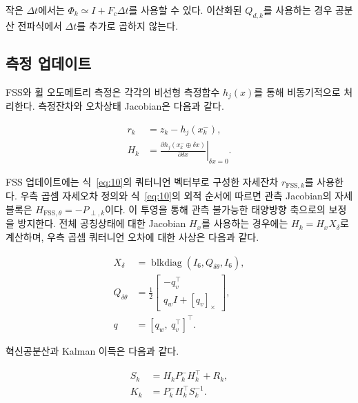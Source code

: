\documentclass[]{IAC_style}
\begin{document}
작은 $\Delta t$에서는 $\Phi_k \simeq I+F_c\Delta t$를 사용할 수 있다. 이산화된 $Q_{d,k}$를 사용하는 경우 공분산 전파식에서 $\Delta t$를 추가로 곱하지 않는다.

\subsection{측정 업데이트}

FSS와 휠 오도메트리 측정은 각각의 비선형 측정함수 $h_j(x)$를 통해 비동기적으로 처리한다. 측정잔차와 오차상태 Jacobian은 다음과 같다.

\begin{equation}
\tag{25}\label{eq:25}
\begin{aligned}r_k&=z_k-h_j(x_k^-),\\H_k&=\left.\frac{\partial h_j(x_k^-\oplus\delta x)}{\partial\delta x}\right|_{\delta x=0}.\end{aligned}
\end{equation}

FSS 업데이트에는 식~\eqref{eq:10}의 쿼터니언 벡터부로 구성한 자세잔차 $r_{\mathrm{FSS},k}$를 사용한다. 우측 곱셈 자세오차 정의와 식~\eqref{eq:10}의 외적 순서에 따르면 관측 Jacobian의 자세 블록은 $H_{\mathrm{FSS},\theta}=-P_{\perp,k}$이다. 이 투영을 통해 관측 불가능한 태양방향 축으로의 보정을 방지한다. 전체 공칭상태에 대한 Jacobian $H_x$를 사용하는 경우에는 $H_k=H_xX_\delta$로 계산하며, 우측 곱셈 쿼터니언 오차에 대한 사상은 다음과 같다.

\begin{equation}
\tag{26}\label{eq:26}
\begin{aligned}X_\delta&=\operatorname{blkdiag}(I_6,Q_{\delta\theta},I_6),\\Q_{\delta\theta}&=\frac12\begin{bmatrix}-q_v^\top\\q_wI+[q_v]_\times\end{bmatrix},\\q&=[q_w,\ q_v^\top]^\top.\end{aligned}
\end{equation}

혁신공분산과 Kalman 이득은 다음과 같다.

\begin{equation}
\tag{27}\label{eq:27}
\begin{aligned}S_k&=H_kP_k^-H_k^\top+R_k,\\K_k&=P_k^-H_k^\top S_k^{-1}.\end{aligned}
\end{equation}
\end{document}
